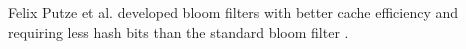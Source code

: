 


Felix Putze et al. developed bloom filters with better cache efficiency and requiring less hash bits than the standard bloom filter \cite{Putze}.

 
